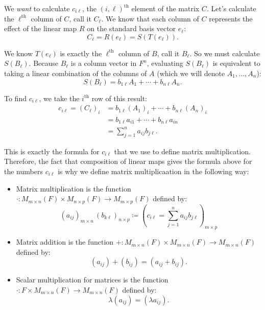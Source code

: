 \documentclass[../linear_algebra_and_groups.tex]{subfiles}
\begin{document}
We \textit{want} to calculate $c_{i\ell}$, the $(i,\ell)^{\mathrm{th}}$ element of the matrix $C$. Let's calculate the $\ell^{\mathrm{th}}$ column of $C$, call it $C_\ell$. We know that each column of $C$ represents the effect of the linear map $R$ on the standard basis vector $e_\ell$:
$$C_\ell = R(e_\ell) = S(T(e_\ell)).$$

We know $T(e_\ell)$ is exactly the $\ell^{\mathrm{th}}$ column of $B$, call it $B_\ell$. So we must calculate $S(B_\ell)$. Because $B_\ell$ is a column vector in $F^n$, evaluating $S(B_\ell)$ is equivalent to taking a linear combination of the columns of $A$ (which we will denote $A_1, \dots, A_n$):
$$S(B_\ell) = b_{1\ell}A_1 + \cdots + b_{n\ell}A_n.$$

To find $c_{i\ell}$, we take the $i^{\mathrm{th}}$ row of this result:
\begin{align*}
    c_{i\ell} = (C_\ell)_i &= b_{1\ell}(A_1)_i + \cdots + b_{n\ell}(A_n)_i \\
    &= b_{1\ell}a_{i1} + \cdots + b_{n\ell}a_{in} \\
    &= \sum_{j=1}^n a_{ij}b_{j\ell}.
\end{align*}

This is exactly the formula for $c_{i\ell}$ that we use to define matrix multiplication. Therefore, the fact that composition of linear maps gives the formula above for the numbers $c_{i\ell}$ is why we define matrix multiplicaation in the following way:

\begin{definition}
    \begin{shaded*}\phantom{A}
        \begin{itemize}
            \item Matrix multiplication is the function $\cdot :M_{m\times n}(F)\times M_{n\times p}(F)\to M_{m\times p}(F)$ defined by: 
        $$(a_{ij})_{m\times n}\,(b_{k\ell})_{n\times p}\coloneqq\left(c_{i\ell}=\sum_{j=1}^n a_{ij}b_{j\ell}\right)_{m\times p}$$
            \item  Matrix addition is the function $+:M_{m\times n}(F)\times M_{m\times n}(F)\to M_{m\times n}(F)$ defined by: 
        $$(a_{ij})+(b_{ij})=(a_{ij}+b_{ij}).$$
            \item Scalar multiplication for matrices is the function $\cdot:F\times M_{m\times n}(F)\to M_{m\times n}(F)$ defined by: 
        $$\lambda(a_{ij})=(\lambda a_{ij}).$$
        \end{itemize}
    \end{shaded*}
\end{definition}
\end{document}

